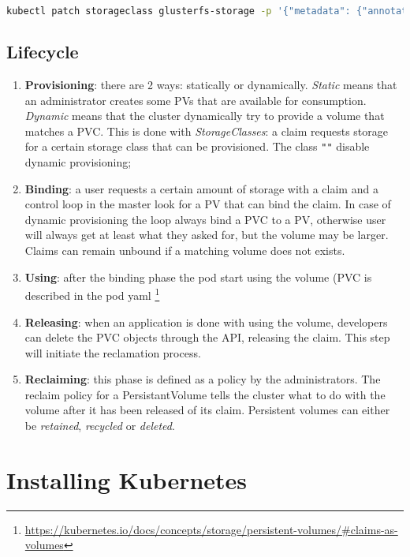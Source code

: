 \begin{lstlisting}[language=bash]
kubectl patch storageclass glusterfs-storage -p '{"metadata": {"annotations":{"storageclass.kubernetes.io/is-default-class":"true"}}}'
\end{lstlisting}

\subsection{Lifecycle}\label{lifecycle}

\begin{enumerate}
  \item \textbf{Provisioning}: there are 2 ways: statically or dynamically.
  \emph{Static} means that an administrator creates some PVs that are
  available for consumption. \emph{Dynamic} means that the cluster
  dynamically try to provide a volume that matches a PVC. This is done
  with \emph{StorageClasses}: a claim requests storage for a certain
  storage class that can be provisioned. The class \texttt{""} disable
  dynamic provisioning;
\item
  \textbf{Binding}: a user requests a certain amount of storage with a
  claim and a control loop in the master look for a PV that can bind the
  claim. In case of dynamic provisioning the loop always bind a PVC to a
  PV, otherwise user will always get at least what they asked for, but
  the volume may be larger. Claims can remain unbound if a matching
  volume does not exists.
\item
  \textbf{Using}: after the binding phase the pod start using the volume
  (PVC is described in the pod yaml
  \footnote{\url{https://kubernetes.io/docs/concepts/storage/persistent-volumes/\#claims-as-volumes}}
\item
  \textbf{Releasing}: when an application is done with using the volume,
  developers can delete the PVC objects through the API, releasing the
  claim. This step will initiate the reclamation process.
\item
  \textbf{Reclaiming}: this phase is defined as a policy by the
  administrators. The reclaim policy for a PersistantVolume tells the
  cluster what to do with the volume after it has been released of its
  claim. Persistent volumes can either be \emph{retained},
  \emph{recycled} or \emph{deleted}.
\end{enumerate}

\section{Installing Kubernetes}\label{installing-kubernetes}

